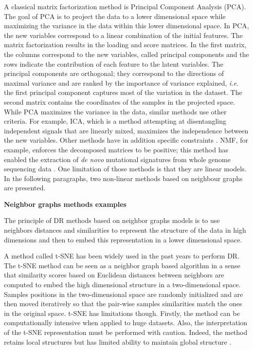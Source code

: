A classical matrix factorization method is Principal Component Analysis (\gls{PCA}). The goal of \gls{PCA} is to project the data to a lower dimensional space while maximizing the variance in the data within this lower dimensional space. In \gls{PCA}, the new variables correspond to a linear combination of the initial features. The matrix factorization results in the loading and score matrices. In the first matrix, the columns correspond to the new variables, called principal components and the rows indicate the contribution of each feature to the latent variables. The principal components are orthogonal; they correspond to the directions of maximal variance and are ranked by the importance of variance explained, \textit{i.e.} the first principal component captures most of the variation in the dataset. The second matrix contains the coordinates of the samples in the projected space.
While \gls{PCA} maximizes the variance in the data, similar methods use other criteria. For example, \gls{ICA}, which is a method attempting at disentangling independent signals that are linearly mixed, maximizes the independence between the new variables. Other methods have in addition specific constraints \cite{Stein-Obrien2018}. \gls{NMF}, for example, enforces the decomposed matrices to be positive; this method has enabled the extraction of \textit{de novo} mutational signatures from whole genome sequencing data \cite{Alexandrov2013a}.
One limitation of those methods is that they are linear models. In the following paragraphs, two non-linear methods based on neighbour graphs are presented. \newline

\textbf{Neighbor graphs methods examples} \newline

The principle of \gls{DR} methods based on neighbor graphs models is to use neighbors distances and similarities to represent the structure of the data in high dimensions and then to embed this representation in a lower dimensional space. 

A method called \gls{t-SNE} \cite{VanDerMaaten2008} has been widely used in the past years to perform \gls{DR}. The \gls{t-SNE} method can be seen as a neighbor graph based algorithm \cite{McInnes2018} in a sense that similarity scores based on Euclidean distances between neighbors are computed to embed the high dimensional structure in a two-dimensional space. %
Samples positions in the two-dimensional space are randomly initialized and are then moved iteratively so that the pair-wise samples similarities match the ones in the original space.  %
\gls{t-SNE} has limitations though. Firstly, the method can be computationally intensive when applied to huge datasets. Also, the interpretation of the \gls{t-SNE} representation must be performed with caution. Indeed, the method retains local structures but has limited ability to maintain global structure \cite{McInnes2018}.  

